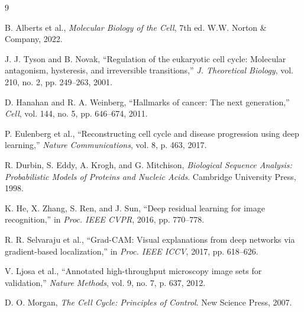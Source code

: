 \documentclass[conference]{IEEEtran}
\begin{document}
\begin{thebibliography}{9}

B. Alberts et al., \textit{Molecular Biology of the Cell}, 7th ed. W.W. Norton \& Company, 2022.

J. J. Tyson and B. Novak, ``Regulation of the eukaryotic cell cycle: Molecular antagonism, hysteresis, and irreversible transitions,'' \textit{J. Theoretical Biology}, vol. 210, no. 2, pp. 249--263, 2001.

D. Hanahan and R. A. Weinberg, ``Hallmarks of cancer: The next generation,'' \textit{Cell}, vol. 144, no. 5, pp. 646--674, 2011.

P. Eulenberg et al., ``Reconstructing cell cycle and disease progression using deep learning,'' \textit{Nature Communications}, vol. 8, p. 463, 2017.

R. Durbin, S. Eddy, A. Krogh, and G. Mitchison, \textit{Biological Sequence Analysis: Probabilistic Models of Proteins and Nucleic Acids}. Cambridge University Press, 1998.

K. He, X. Zhang, S. Ren, and J. Sun, ``Deep residual learning for image recognition,'' in \textit{Proc. IEEE CVPR}, 2016, pp. 770--778.

R. R. Selvaraju et al., ``Grad-CAM: Visual explanations from deep networks via gradient-based localization,'' in \textit{Proc. IEEE ICCV}, 2017, pp. 618--626.

V. Ljosa et al., ``Annotated high-throughput microscopy image sets for validation,'' \textit{Nature Methods}, vol. 9, no. 7, p. 637, 2012.

D. O. Morgan, \textit{The Cell Cycle: Principles of Control}. New Science Press, 2007.

\end{thebibliography}
\end{document}
